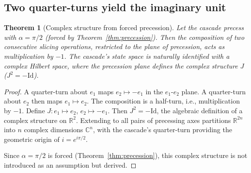 \documentclass[12pt,a4paper]{article}
\newtheorem{theorem}{Theorem}[section]
\begin{document}
\subsection{Two quarter-turns yield the imaginary unit}

\begin{theorem}[Complex structure from forced precession]\label{thm:complex}
Let the cascade precess with $\alpha=\pi/2$ (forced by Theorem~\ref{thm:precession}). Then
the composition of two consecutive slicing operations, restricted to the plane of precession,
acts as multiplication by $-1$. The cascade's state space is naturally identified with a
complex Hilbert space, where the precession plane defines the complex structure $J$
($J^2=-\mathrm{Id}$).
\end{theorem}
\begin{proof}
A quarter-turn about $e_1$ maps $e_2\mapsto -e_1$ in the $e_1$-$e_2$ plane. A quarter-turn
about $e_2$ then maps $e_1\mapsto e_2$. The composition is a half-turn, i.e., multiplication
by $-1$. Define $J:e_1\mapsto e_2$, $e_2\mapsto -e_1$. Then $J^2=-\mathrm{Id}$, the
algebraic definition of a complex structure on $\mathbb{R}^2$. Extending to all pairs of
precessing axes partitions $\mathbb{R}^{2n}$ into $n$ complex dimensions $\mathbb{C}^n$,
with the cascade's quarter-turn providing the geometric origin of $i=e^{i\pi/2}$.

Since $\alpha=\pi/2$ is forced (Theorem~\ref{thm:precession}), this complex structure is
not introduced as an assumption but derived.
\end{proof}
\end{document}
